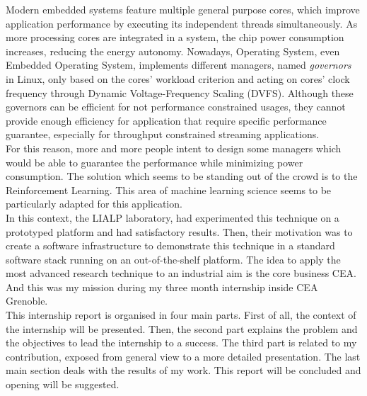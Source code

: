 Modern embedded systems feature multiple general purpose cores, which improve application performance by executing its independent threads simultaneously. 
As more processing cores are integrated in a system, the chip power consumption increases, reducing the energy autonomy.
Nowadays, Operating System, even Embedded Operating System, implements different managers, named \textit{governors} in Linux, only based on the cores' workload criterion and acting on cores' clock frequency through Dynamic Voltage-Frequency Scaling (DVFS). 
Although these governors can be efficient for not performance constrained usages, they cannot provide enough efficiency for application that require specific performance guarantee, especially for throughput constrained streaming applications.\\
For this reason, more and more people intent to design some managers which would be able to guarantee the performance while minimizing power consumption. 
The solution which seems to be standing out of the crowd is to the Reinforcement Learning. \cite{das2015hardware}\cite{molnos2016investigation}\cite{tesauro2007managing} This area of machine learning science seems to be particularly adapted for this application.\\

In this context, the LIALP laboratory, had experimented this technique on a prototyped platform and had satisfactory results. Then, their motivation was to create a software infrastructure to demonstrate this technique in a standard software stack running on an out-of-the-shelf platform. The idea to apply the most advanced research technique to an industrial aim is the core business CEA. And this was my mission during my three month internship inside CEA Grenoble.\\

This internship report is organised in four main parts. First of all, the context of the internship will be presented. Then, the second part explains the problem and the objectives to lead the internship to a success. The third part is related to my contribution, exposed from general view to a more detailed presentation. The last main section deals with the results of my work. This report will be concluded and opening will be suggested.\\